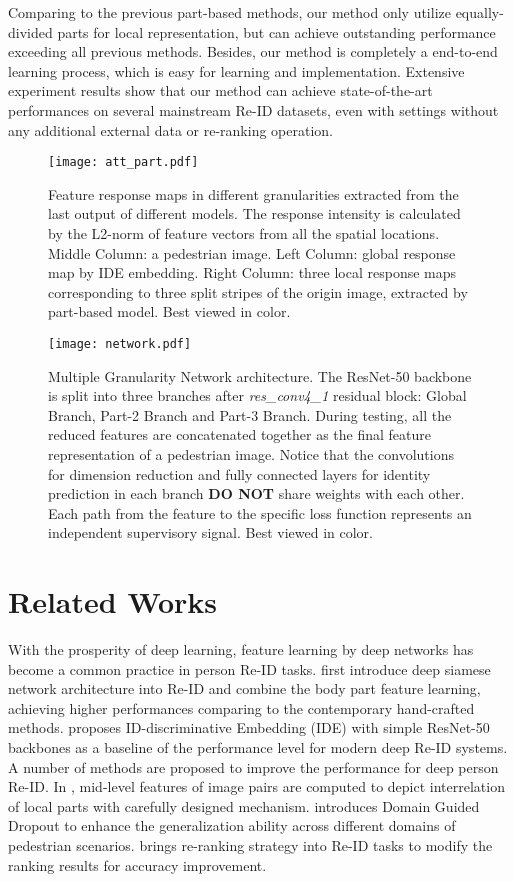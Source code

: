 \documentclass[sigconf]{acmart}
\begin{document}
Comparing to the previous part-based methods, our method only utilize equally-divided parts for local representation, but can achieve outstanding performance exceeding all previous methods. Besides, our method is completely a end-to-end learning process, which is easy for learning and implementation.  Extensive experiment results show that our method can achieve state-of-the-art performances on several mainstream Re-ID datasets, even with settings without any additional external data or re-ranking \cite{zhong2017rerank} operation. 


\begin{figure}
	\texttt{[image: att\_part.pdf]}
	\caption{Feature response maps in different granularities extracted from the last output of different models. The response intensity is calculated by the L2-norm of feature vectors from all the spatial locations. Middle Column: a pedestrian image. Left Column: global response map by IDE embedding. Right Column: three local response maps corresponding to three split stripes of the origin image, extracted by part-based model. Best viewed in color.}
\end{figure}


\begin{figure*}
	\texttt{[image: network.pdf]}
	\caption{Multiple Granularity Network architecture. The ResNet-50 backbone is split into three branches after \textit{res\_conv4\_1} residual block: Global Branch, Part-2 Branch and Part-3 Branch. During testing, all the reduced features are concatenated together as the final feature representation of a pedestrian image. Notice that the  convolutions for dimension reduction and fully connected layers for identity prediction in each branch \textbf{DO NOT} share weights with each other. Each path from the feature to the specific loss function represents an independent supervisory signal. Best viewed in color.}
\end{figure*}

\section{Related Works}
With the prosperity of deep learning, feature learning by deep networks has become a common practice in person Re-ID tasks. \cite{li2014deepreid,yi2014deep} first introduce deep siamese network architecture into Re-ID and combine the body part feature learning, achieving higher performances comparing to the contemporary hand-crafted methods. \cite{zheng2016person} proposes ID-discriminative Embedding (IDE) with simple ResNet-50 backbones as a baseline of the performance level for modern deep Re-ID systems. A number of methods are proposed to improve the performance for deep person Re-ID. In \cite{ahmed2015improved, varior2016gated}, mid-level features of image pairs are computed to depict interrelation of local parts with carefully designed mechanism. \cite{xiao2016learnin} introduces Domain Guided Dropout to enhance the generalization ability across different domains of pedestrian scenarios. \cite{zhong2017rerank} brings re-ranking strategy into Re-ID tasks to modify the ranking results for accuracy improvement. 
\end{document}
